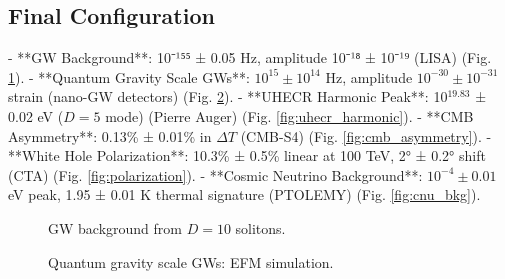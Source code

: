 \documentclass[11pt]{article}
\begin{document}
\subsection{Final Configuration}
- **GW Background**: 10⁻¹⁵⁵ ± 0.05 Hz, amplitude 10⁻¹⁸ ± 10⁻¹⁹ (LISA) (Fig. \ref{fig:gw_background}).
- **Quantum Gravity Scale GWs**: \(10^{15} \pm 10^{14}\) Hz, amplitude \(10^{-30} \pm 10^{-31}\) strain (nano-GW detectors) (Fig. \ref{fig:qg_gw}).
- **UHECR Harmonic Peak**: 10$^{19.83}$ ± 0.02 eV (\(D = 5\) mode) (Pierre Auger) (Fig. \ref{fig:uhecr_harmonic}).
- **CMB Asymmetry**: 0.13\% ± 0.01\% in \(\Delta T\) (CMB-S4) (Fig. \ref{fig:cmb_asymmetry}).
- **White Hole Polarization**: 10.3\% ± 0.5\% linear at 100 TeV, 2° ± 0.2° shift (CTA) (Fig. \ref{fig:polarization}).
- **Cosmic Neutrino Background**: \(10^{-4} \pm 0.01\) eV peak, 1.95 ± 0.01 K thermal signature (PTOLEMY) (Fig. \ref{fig:cnu_bkg}).

\begin{figure}[h]
    \centering
    \caption{GW background from \(D = 10\) solitons.}
    \label{fig:gw_background}
\end{figure}

\begin{figure}[h]
    \centering
    \caption{Quantum gravity scale GWs: EFM simulation.}
    \label{fig:qg_gw}
\end{figure}
\end{document}
